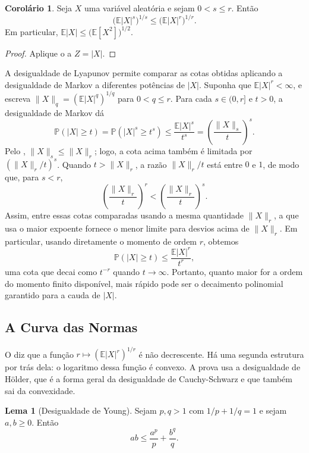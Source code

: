 \documentclass[12pt,portuguese]{article}
\theoremstyle{definition}
\newtheorem{corollary}[corollary]{Corolário}
\newtheorem{lemma}[lemma]{Lema}
\theoremstyle{plainexercise}
\theoremstyle{starredexercise}
\theoremstyle{definition}
\begin{document}
\begin{corollary}\label{cor:lyapunov-momentos}
Seja $X$ uma variável aleatória e sejam $0<s\leqslant r$. Então
\[
\bigl(\mathbb{E}|X|^s\bigr)^{1/s}
\leqslant
\bigl(\mathbb{E}|X|^r\bigr)^{1/r}.
\]
Em particular, $\mathbb{E}|X|\leqslant\bigl(\mathbb{E}[X^2]\bigr)^{1/2}$.
\end{corollary}

\begin{proof}
Aplique o  a $Z=|X|$.
\end{proof}

A desigualdade de Lyapunov permite comparar as cotas obtidas aplicando a
desigualdade de Markov a diferentes potências de $|X|$. Suponha que
$\mathbb{E}|X|^r<\infty$, e escreva
$\|X\|_q=(\mathbb{E}|X|^q)^{1/q}$ para $0<q\leqslant r$. Para cada
$s\in(0,r]$ e $t>0$, a desigualdade de Markov dá
\[
\mathbb{P}(|X|\geqslant t)
=
\mathbb{P}(|X|^s\geqslant t^s)
\leqslant
\frac{\mathbb{E}|X|^s}{t^s}
=\left(\frac{\|X\|_s}{t}\right)^s.
\]
Pelo , $\|X\|_s\leqslant\|X\|_r$; logo, a
cota acima também é limitada por $(\|X\|_r/t)^s$. Quando
$t>\|X\|_r$, a razão $\|X\|_r/t$ está entre $0$ e $1$, de modo que, para
$s<r$,
\[
\left(\frac{\|X\|_r}{t}\right)^r
<
\left(\frac{\|X\|_r}{t}\right)^s.
\]
Assim, entre essas cotas comparadas usando a mesma quantidade $\|X\|_r$, a
que usa o maior expoente fornece o menor limite para desvios acima de
$\|X\|_r$. Em particular, usando diretamente o momento de ordem $r$,
obtemos
\[
\mathbb{P}(|X|\geqslant t)
\leqslant \frac{\mathbb{E}|X|^r}{t^r},
\]
uma cota que decai como $t^{-r}$ quando $t\to\infty$. Portanto, quanto maior
for a ordem do momento finito disponível, mais rápido pode ser o decaimento
polinomial garantido para a cauda de $|X|$.

\subsection{A Curva das Normas}\label{subsec:curva-normas}

O  diz que a função $r\longmapsto(\mathbb{E}|X|^r)^{1/r}$ é não
decrescente. Há uma segunda estrutura por trás dela: o logaritmo dessa função é
convexo. A prova usa a desigualdade de Hölder, que é a forma geral da
desigualdade de Cauchy-Schwarz e que também sai da convexidade.

\begin{lemma}[Desigualdade de Young]\label{lem:young}
Sejam $p,q>1$ com $1/p+1/q=1$ e sejam $a,b\geqslant0$. Então
\[
ab\leqslant\frac{a^p}{p}+\frac{b^q}{q}.
\]
\end{lemma}
\end{document}
